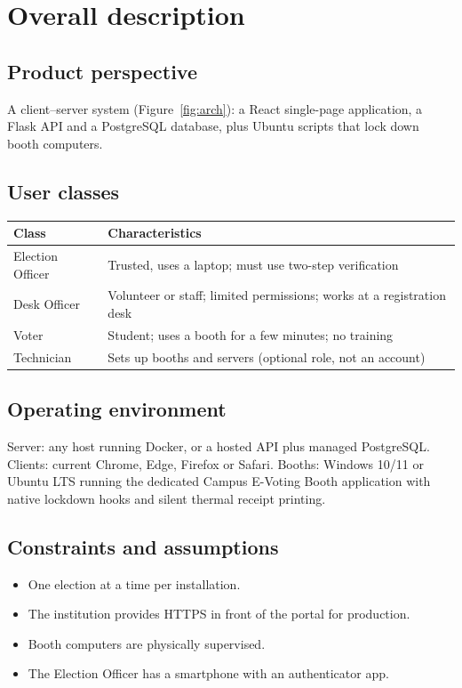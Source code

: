 \section{Overall description}

\subsection{Product perspective}
A client--server system (Figure~\ref{fig:arch}): a React single-page application, a Flask API and a PostgreSQL database, plus Ubuntu scripts that lock down booth computers.

\subsection{User classes}
\begin{center}
\begin{tabularx}{\linewidth}{@{}lX@{}}
\toprule
\textbf{Class} & \textbf{Characteristics} \\
\midrule
Election Officer & Trusted, uses a laptop; must use two-step verification \\
Desk Officer & Volunteer or staff; limited permissions; works at a registration desk \\
Voter & Student; uses a booth for a few minutes; no training \\
Technician & Sets up booths and servers (optional role, not an account) \\
\bottomrule
\end{tabularx}
\end{center}

\subsection{Operating environment}
Server: any host running Docker, or a hosted API plus managed PostgreSQL. Clients: current Chrome, Edge, Firefox or Safari. Booths: Windows 10/11 or Ubuntu LTS running the dedicated Campus E-Voting Booth application with native lockdown hooks and silent thermal receipt printing.

\subsection{Constraints and assumptions}
\begin{itemize}
  \item One election at a time per installation.
  \item The institution provides HTTPS in front of the portal for production.
  \item Booth computers are physically supervised.
  \item The Election Officer has a smartphone with an authenticator app.
\end{itemize}


